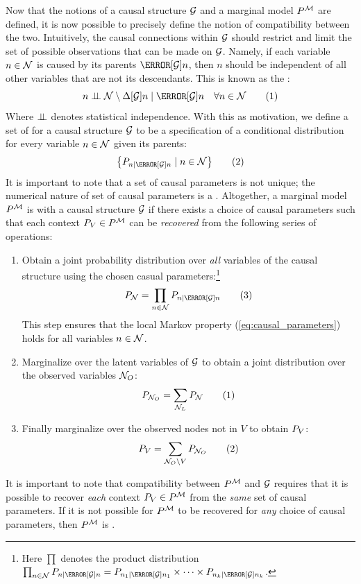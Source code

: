 \documentclass[aps, 10pt, english, twoside, pra, nofootinbib, tightenlines, longbibliography]{revtex4-1}
\begin{document}
    Now that the notions of a causal structure $\mathcal{G}$ and a marginal model $\prob^{\mscenario}$ are defined, it is now possible to precisely define the notion of compatibility between the two. Intuitively, the causal connections within $\mathcal{G}$ should restrict and limit the set of possible observations that can be made on $\mathcal{G}$. Namely, if each variable $n \in \mathcal{N}$ is caused by its parents $\Pa[\graph]{n}$, then $n$ should be independent of all other variables that are not its descendants. This is known as the :
    \[ n \indep \nodes \setminus \De[\graph]{n} \mid \Pa[\graph]{n} \quad \forall n \in \nodes \eq \label{eq:local_markov_property} \]
    Where $\perp\!\!\!\perp$ denotes statistical independence. With this as motivation, we define a set of  for a causal structure $\mathcal{G}$ to be a specification of a conditional distribution for every variable $n \in \mathcal{N}$ given its parents:
    \[ \bc{\prob[n \mid \Pa[\graph]{n}] \mid n \in \nodes} \eq \label{eq:causal_parameters} \]
    It is important to note that a set of causal parameters is not unique; the numerical nature of set of causal parameters is a . Altogether, a marginal model $\prob^{\mscenario}$ is  with a causal structure $\mathcal{G}$ if there exists a choice of causal parameters such that each context $\prob[V] \in \prob^{\mscenario}$ can be \textit{recovered} from the following series of operations:
    \begin{enumerate}
        \item Obtain a joint probability distribution over \textit{all} variables of the causal structure using the chosen casual parameters:\footnote{Here $\prod$ denotes the product distribution $\prod_{n \in \nodes} \prob[n \mid \Pa[\graph]{n}] = \prob[n_1 \mid \Pa[\graph]{n_1}] \times \cdots \times \prob[n_k \mid \Pa[\graph]{n_k}]$.}
        \[ \prob[\nodes] = \prod_{n \in \nodes} \prob[n \mid \Pa[\graph]{n}] \eq \label{eq:local_markov_property_operation}\]
        This step ensures that the local Markov property (\cref{eq:causal_parameters}) holds for all variables $n \in \mathcal{N}$.
        \item Marginalize over the latent variables of $\mathcal{G}$ to obtain a joint distribution over the observed variables $\mathcal{N}_O$:
        \[ \prob[\nodes_O] = \sum_{\nodes_L} \prob[\nodes] \eq \label{eq:observable_marginalization} \]
        \item Finally marginalize over the observed nodes not in $V$ to obtain $\prob[V]$:
        \[ \prob[V] = \sum_{\nodes_O \setminus V} \prob[\nodes_O] \eq \label{eq:context_marginalization} \]
    \end{enumerate}
    It is important to note that compatibility between $\prob^{\mscenario}$ and $\mathcal{G}$ requires that it is possible to recover \textit{each} context $\prob[V] \in \prob^{\mscenario}$ from the \textit{same} set of causal parameters. If it is not possible for $\prob^{\mscenario}$ to be recovered for \textit{any} choice of causal parameters, then $\prob^{\mscenario}$ is .
\end{document}
